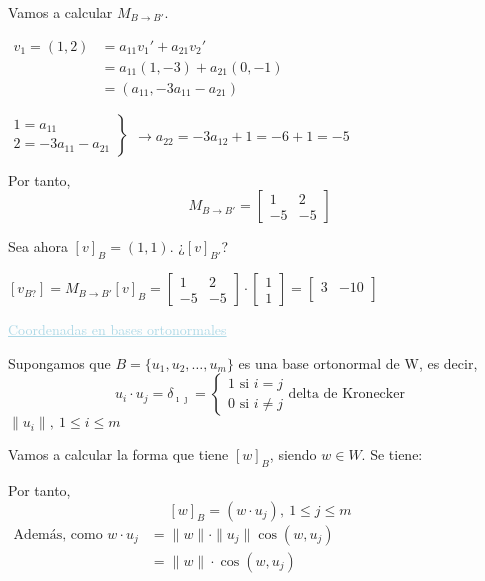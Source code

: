 \documentclass[12pt]{article}
\begin{document}
Vamos a calcular $M_{B\rightarrow B'}$.

$\begin{array}{rl}
v_{1}=(1,2) & =a_{11}v_1'+a_{21}v_2'\\
 & =a_{11}(1,-3)+a_{21}(0,-1)\\
 & =(a_{11},-3a_{11}-a_{21})
\end{array}$

\vspace{1cm}

$\left.\begin{array}{l}
1=a_{11}\\
2=-3a_{11}-a_{21}
\end{array}\right\rbrace\begin{array}{l}
\\
\longrightarrow a_{22}=-3a_{12}+1=-6+1=-5
\end{array}$

Por tanto, \[M_{B\rightarrow B'}=\begin{bmatrix}
1 & 2 \\ 
-5 & -5
\end{bmatrix} \]

Sea ahora $[v]_B=(1,1)$. ¿$[v]_{B'}$?

$[v_{B?}]=M_{B\rightarrow B'}[v]_B=\begin{bmatrix}
1 & 2 \\ 
-5 & -5
\end{bmatrix}\cdot\begin{bmatrix}
1\\
1
\end{bmatrix}=\begin{bmatrix}
3 & -10\\
\end{bmatrix}$

\textcolor{lightblue}{\underline{Coordenadas en bases ortonormales}}

Supongamos que $B=\{u_1,u_2,\hdots,u_m\}$ es una base ortonormal de W, es decir, \[u_i\cdot u_j=\delta_{\imath\jmath  }=\left\lbrace\begin{array}{l}
1 \text{ si }i=j\\
0 \text{ si }i\neq j
\end{array}\right.\text{delta de Kronecker}\]
$\|u_i\|,~1\le i\le m$

Vamos a calcular la forma que tiene $[w]_B$, siendo $w\in W$. Se tiene: \begin{center}
\end{center}
Por tanto, \[[w]_B=(w\cdot u_j),~1\le j\le m\]
$\begin{array}{rl}
\text{Además, como }w\cdot u_j & =\|w\|\cdot\|u_j\|\cos(w,u_j)\\
 & =\|w\|\cdot\cos(w,u_j)
\end{array}$
\end{document}
